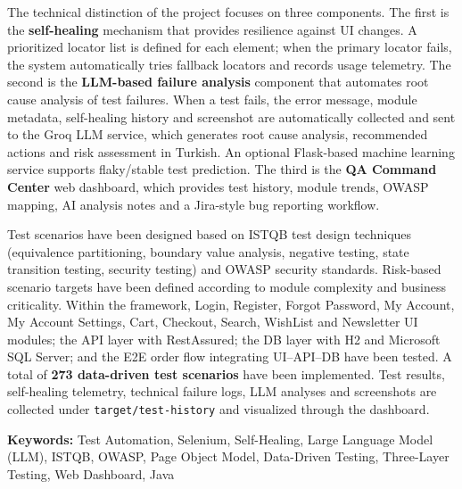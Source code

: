 The technical distinction of the project focuses on three components. The first is the \textbf{self-healing} mechanism that provides resilience against UI changes. A prioritized locator list is defined for each element; when the primary locator fails, the system automatically tries fallback locators and records usage telemetry. The second is the \textbf{LLM-based failure analysis} component that automates root cause analysis of test failures. When a test fails, the error message, module metadata, self-healing history and screenshot are automatically collected and sent to the Groq LLM service, which generates root cause analysis, recommended actions and risk assessment in Turkish. An optional Flask-based machine learning service supports flaky/stable test prediction. The third is the \textbf{QA Command Center} web dashboard, which provides test history, module trends, OWASP mapping, AI analysis notes and a Jira-style bug reporting workflow.

Test scenarios have been designed based on ISTQB test design techniques (equivalence partitioning, boundary value analysis, negative testing, state transition testing, security testing) and OWASP security standards. Risk-based scenario targets have been defined according to module complexity and business criticality. Within the framework, Login, Register, Forgot Password, My Account, My Account Settings, Cart, Checkout, Search, WishList and Newsletter UI modules; the API layer with RestAssured; the DB layer with H2 and Microsoft SQL Server; and the E2E order flow integrating UI--API--DB have been tested. A total of \textbf{273 data-driven test scenarios} have been implemented. Test results, self-healing telemetry, technical failure logs, LLM analyses and screenshots are collected under \texttt{target/test-history} and visualized through the dashboard.

\vspace{2cm}
\textbf{Keywords:} Test Automation, Selenium, Self-Healing, Large Language Model (LLM), ISTQB, OWASP, Page Object Model, Data-Driven Testing, Three-Layer Testing, Web Dashboard, Java

\pagebreak{}
